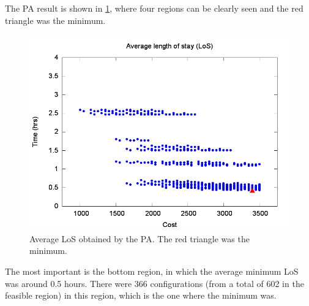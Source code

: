 The PA result is shown in \ref{subfig:pipe4-1}, where four regions
can be clearly seen and the red triangle was the minimum. 
\begin{figure}[H]
\noindent \begin{centering}
\includegraphics[width=0.95\columnwidth,height=0.23\paperheight]{figs4/v0/6400-602-25-pipe-LoS-min}
\par\end{centering}

\caption{Average LoS obtained by the PA. The red triangle was the minimum.
\label{subfig:pipe4-1}}
\end{figure}
The most important is the bottom region, in which the average minimum
LoS was around 0.5 hours. There were 366 configurations (from a total
of 602 in the feasible region) in this region, which is the one where
the minimum was.

